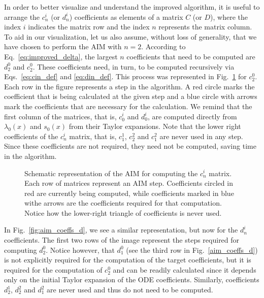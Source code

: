 In order to better visualize and understand the improved algorithm, it is useful to arrange the $c^i_n$ (or $d^i_n$) coefficients as elements of a matrix $C$ (or $D$), where the index $i$ indicates the matrix row and the index $n$ represents the matrix column. To aid in our visualization, let us also assume, without loss of generality, that we have chosen to perform the AIM with $n=2$. According to Eq.~\eqref{eq:improved_delta}, the largest $n$ coefficients that need to be computed  are $d^0_2$ and $c^0_2$. These coefficients need, in turn, to be computed recursively via Eqs.~\eqref{eq:cin_def} and \eqref{eq:din_def}. This process was represented in Fig.~\ref{fig:aim_coeffs_c} for $c^0_2$. Each row in the figure represents a step in the algorithm. A red circle marks the coefficient that is being calculated at the given step and a blue circle with arrows mark the coefficients that are necessary for the calculation. We remind that the first column of the matrices, that is, $c^i_0$ and $d^i_0$, are computed directly from $\lambda_0(x)$ and $s_0(x)$ from their Taylor expansions. Note that the lower right coefficients of the $c^i_n$ matrix, that is, $c^1_1$, $c^2_2$ and $c^2_1$ are never used in any step. Since these coefficients are not required, they need not be computed, saving time in the algorithm.

\begin{figure}[!ht]
  \centering
  
  \caption{Schematic representation of the AIM for computing the $c^i_n$ matrix. Each row of matrices represent an AIM step. Coefficients circled in red are currently being computed, while coefficients marked in blue withe arrows are the coefficients required for that computation. Notice how the lower-right triangle of coefficients is never used.}
  \label{fig:aim_coeffs_c}
\end{figure}

In  Fig.~\ref{fig:aim_coeffs_d}, we see a similar representation, but now for the $d^i_n$ coefficients. The first two rows of the image represent the steps required for computing $d^0_2$. Notice however, that $d^0_1$ (see the third row in Fig.~\ref{aim_coeffs_d}) is not explicitly required for the computation of the target coefficients, but it is required for the computation of $c^0_2$ and can be readily calculated since it depends only on the initial Taylor expansion of the ODE coefficients. Similarly, coefficients $d^1_2$, $d^2_2$ and $d^2_1$ are never used and thus do not need to be computed.

